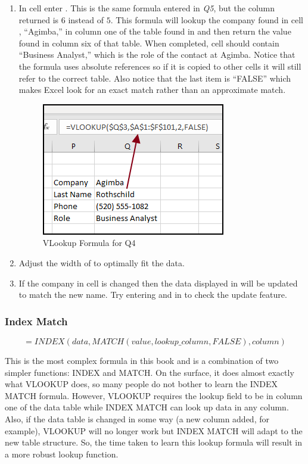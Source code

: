 \begin{enumbox}
\begin{enumerate}
		\item In cell  enter . This is the same formula entered in \textit{Q5}, but the column returned is $ 6 $ instead of $ 5 $. This formula will lookup the company found in cell , ``Agimba,'' in column one of the table found in  and then return the value found in column six of that table. When completed, cell  should contain ``Business Analyst,'' which is the role of the contact at Agimba.  Notice that the formula uses absolute references so if it is copied to other cells it will still refer to the correct table. Also notice that the last item is ``FALSE'' which makes Excel look for an exact match rather than an approximate match.
		
		\begin{figure}[H]
			\centering
			\includegraphics[width=\maxwidth{.75\linewidth}]{gfx/ch09_fig36}
			\caption{VLookup Formula for Q4}
			\label{09:fig36}
		\end{figure}
		
		\item Adjust the width of  to optimally fit the data.
		\item If the company in cell  is changed then the data displayed in  will be updated to match the new name. Try entering  and  in  to check the update feature.
	\end{enumerate}
\end{enumbox}
	
\subsubsection{Index Match}

\[ =INDEX(data,MATCH(value,lookup\_column,FALSE),column) \]

This is the most complex formula in this book and is a combination of two simpler functions: INDEX and MATCH. On the surface, it does almost exactly what VLOOKUP does, so many people do not bother to learn the INDEX MATCH formula. However, VLOOKUP requires the lookup field to be in column one of the data table while INDEX MATCH can look up data in any column. Also, if the data table is changed in some way (a new column added, for example), VLOOKUP will no longer work but INDEX MATCH will adapt to the new table structure. So, the time taken to learn this lookup formula will result in a more robust lookup function.

